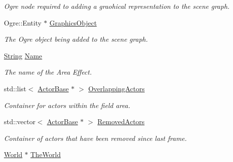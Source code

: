 \begin{DoxyCompactItemize}
\begin{DoxyCompactList}\small\item\em Ogre node required to adding a graohical representation to the scene graph. \item\end{DoxyCompactList}\item 
\hypertarget{classphys_1_1AreaEffect_a31b755c85d318438e42e300de56d2e5c}{
Ogre::Entity $\ast$ \hyperlink{classphys_1_1AreaEffect_a31b755c85d318438e42e300de56d2e5c}{GraphicsObject}}
\label{classphys_1_1AreaEffect_a31b755c85d318438e42e300de56d2e5c}

\begin{DoxyCompactList}\small\item\em The Ogre object being added to the scene graph. \item\end{DoxyCompactList}\item 
\hypertarget{classphys_1_1AreaEffect_a1cf5a878eb22b30a166f5b065944a986}{
\hyperlink{namespacephys_aa03900411993de7fbfec4789bc1d392e}{String} \hyperlink{classphys_1_1AreaEffect_a1cf5a878eb22b30a166f5b065944a986}{Name}}
\label{classphys_1_1AreaEffect_a1cf5a878eb22b30a166f5b065944a986}

\begin{DoxyCompactList}\small\item\em The name of the Area Effect. \item\end{DoxyCompactList}\item 
\hypertarget{classphys_1_1AreaEffect_a45834591f0ea49ba6657ce58d070ee9b}{
std::list$<$ \hyperlink{classphys_1_1ActorBase}{ActorBase} $\ast$ $>$ \hyperlink{classphys_1_1AreaEffect_a45834591f0ea49ba6657ce58d070ee9b}{OverlappingActors}}
\label{classphys_1_1AreaEffect_a45834591f0ea49ba6657ce58d070ee9b}

\begin{DoxyCompactList}\small\item\em Container for actors within the field area. \item\end{DoxyCompactList}\item 
\hypertarget{classphys_1_1AreaEffect_a1b1b6cced61ead4d6de3d8bad5c2125a}{
std::vector$<$ \hyperlink{classphys_1_1ActorBase}{ActorBase} $\ast$ $>$ \hyperlink{classphys_1_1AreaEffect_a1b1b6cced61ead4d6de3d8bad5c2125a}{RemovedActors}}
\label{classphys_1_1AreaEffect_a1b1b6cced61ead4d6de3d8bad5c2125a}

\begin{DoxyCompactList}\small\item\em Container of actors that have been removed since last frame. \item\end{DoxyCompactList}\item 
\hypertarget{classphys_1_1AreaEffect_a3008e8e90236141ca4c21a9580e6f5de}{
\hyperlink{classphys_1_1World}{World} $\ast$ \hyperlink{classphys_1_1AreaEffect_a3008e8e90236141ca4c21a9580e6f5de}{TheWorld}}
\label{classphys_1_1AreaEffect_a3008e8e90236141ca4c21a9580e6f5de}


\end{DoxyCompactItemize}
